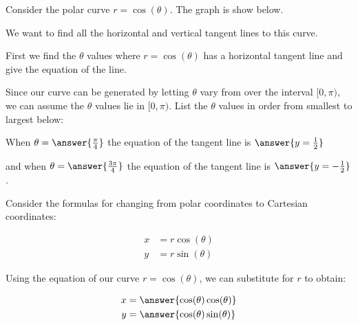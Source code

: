 \documentclass{ximera}
\author{Jason Miller}
\begin{document}
\begin{exercise}


Consider the polar curve $r=\cos(\theta)$. The graph is show below. 




\begin{image}  
\end{image} 

We want to find all the horizontal and vertical tangent lines to this curve.

First we find the $\theta$ values where $r=\cos(\theta)$ has a horizontal tangent line and give the equation of the line. 

Since our curve can be generated by letting $\theta$ vary from over the interval $[0, \pi)$, we can assume the $\theta$ values lie in $[0, \pi)$. List the $\theta$ values in order from smallest to largest below: 


When $\theta=\answer{\frac{\pi}{4}}$ the equation of the tangent line is $\answer{y=\frac{1}{2}  }$ 

and when $\theta=\answer{\frac{3\pi}{4}}$ the equation of the tangent line is $\answer{y=-\frac{1}{2}}$. 




\begin{hint}

Consider the formulas for changing from polar coordinates to Cartesian coordinates:

\begin{align*}
x&=r\cos(\theta) \\
y&=r\sin(\theta)
\end{align*}

Using the equation of our curve $r=\cos(\theta)$, we can substitute for $r$ to obtain:

\begin{align*}
x&=\answer{\cos(\theta)\cos(\theta)} \\
y&=\answer{\cos(\theta)\sin(\theta) }
\end{align*}


\end{hint}
\end{exercise}
\end{document}
